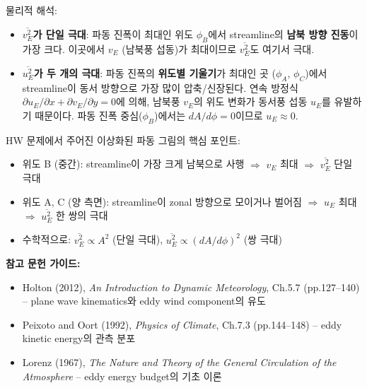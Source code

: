 \begin{hisublock}
물리적 해석:
\begin{itemize}
  \item \textbf{$\overline{v_{E}^{2}}$가 단일 극대}: 파동 진폭이 최대인 위도 $\phi_{B}$에서
        streamline의 \textbf{남북 방향 진동}이 가장 크다.
        이곳에서 $v_{E}$ (남북풍 섭동)가 최대이므로 $\overline{v_{E}^{2}}$도 여기서 극대.
  \item \textbf{$\overline{u_{E}^{2}}$가 두 개의 극대}: 파동 진폭의 \textbf{위도별 기울기}가 최대인 곳
        ($\phi_{A}$, $\phi_{C}$)에서 streamline이 동서 방향으로 가장 많이 압축/신장된다.
        연속 방정식 $\partial u_{E}/\partial x + \partial v_{E}/\partial y = 0$에 의해,
        남북풍 $v_{E}$의 위도 변화가 동서풍 섭동 $u_{E}$를 유발하기 때문이다.
        파동 진폭 중심($\phi_{B}$)에서는 $dA/d\phi = 0$이므로 $u_{E} \approx 0$.
\end{itemize}
\end{hisublock}

\begin{hisublock}
HW 문제에서 주어진 이상화된 파동 그림의 핵심 포인트:
\begin{itemize}
  \item 위도 B (중간): streamline이 가장 크게 남북으로 사행 $\Rightarrow$ $v_{E}$ 최대 $\Rightarrow$ $\overline{v_{E}^{2}}$ 단일 극대
  \item 위도 A, C (양 측면): streamline이 zonal 방향으로 모이거나 벌어짐 $\Rightarrow$ $u_{E}$ 최대 $\Rightarrow$ $\overline{u_{E}^{2}}$ 한 쌍의 극대
  \item 수학적으로: $\overline{v_{E}^{2}} \propto A^{2}$ (단일 극대), $\overline{u_{E}^{2}} \propto (dA/d\phi)^{2}$ (쌍 극대)
\end{itemize}
\end{hisublock}

\begin{hisublock}
\textbf{참고 문헌 가이드:}
\begin{itemize}
  \item Holton (2012), \textit{An Introduction to Dynamic Meteorology}, Ch.5.7 (pp.127--140) -- plane wave kinematics와 eddy wind component의 유도
  \item Peixoto and Oort (1992), \textit{Physics of Climate}, Ch.7.3 (pp.144--148) -- eddy kinetic energy의 관측 분포
  \item Lorenz (1967), \textit{The Nature and Theory of the General Circulation of the Atmosphere} -- eddy energy budget의 기초 이론
\end{itemize}
\end{hisublock}


